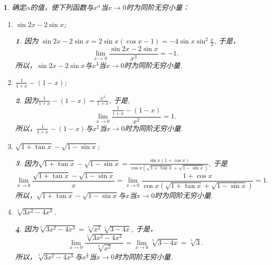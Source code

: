 \documentclass[utf8]{book}
\newtheorem{example}{}[section]             %
\newtheorem{solution}{}
\begin{document}
\begin{example}确定$\alpha$的值，使下列函数与$x^{\alpha}$当$x\to 0$时为同阶无穷小量：
\renewcommand\labelenumi{\normalfont(\theenumi)}
\begin{enumerate}
\item $\sin{2x}-2\sin{x}$;
\begin{solution}因为
$\sin{2x}-2\sin{x}=2\sin{x}(\cos{x}-1) = -4\sin{x}\sin^2{\frac{x}{2}}$,
于是，$$\displaystyle\lim_{x\to 0}\frac{\sin{2x}-2\sin{x}}{x^3} = -1.$$
所以，$\sin{2x}-2\sin{x}$与$x^3$当$x\to 0$时为同阶无穷小量.
\end{solution}
\item $\displaystyle\frac{1}{1+x}-(1-x)$;
\begin{solution}因为$\displaystyle\frac{1}{1+x}-(1-x)=\frac{x^2}{1+x}$,
于是, $$\displaystyle\lim_{x\to 0}\frac{\displaystyle\frac{1}{1+x}-(1-x)}{x^2} = 1.$$
所以，$\displaystyle\frac{1}{1+x}-(1-x)$与$x^2$当$x\to 0$时为同阶无穷小量.
\end{solution}
\item $\sqrt{1+\tan{x}}-\sqrt{1-\sin{x}}$;
\begin{solution}因为$\sqrt{1+\tan{x}}-\sqrt{1-\sin{x}}=\displaystyle\frac{\sin{x}(1+\cos{x})}{\cos{x}(\sqrt{1+\tan{x}}+\sqrt{1-\sin{x}})}$,
于是$$\displaystyle\lim_{x\to 0}\frac{\sqrt{1+\tan{x}}-\sqrt{1-\sin{x}}}{x} = \displaystyle\lim_{x\to 0}\displaystyle\frac{1+\cos{x}}{\cos{x}(\sqrt{1+\tan{x}}+\sqrt{1-\sin{x}})}=1.$$
所以，$\sqrt{1+\tan{x}}-\sqrt{1-\sin{x}}$与$x$当$x\to 0$时为同阶无穷小量.
\end{solution}
\item $\sqrt[5]{3x^2-4x^3}$.
\begin{solution}因为$\sqrt[5]{3x^2-4x^3}=\sqrt[5]{x^2}\sqrt[5]{3-4x}$,
于是，$$\displaystyle\lim_{x\to 0}\frac{\sqrt[5]{3x^2-4x^3}}{\sqrt[5]{x^2}} = \displaystyle\lim_{x\to 0}\sqrt[5]{3-4x}=\sqrt[5]{3}.$$
所以，$\sqrt[5]{3x^2-4x^3}$与$x^{\frac{2}{5}}$当$x\to 0$时为同阶无穷小量.
\end{solution}
\end{enumerate}
\end{example}
\end{document}

